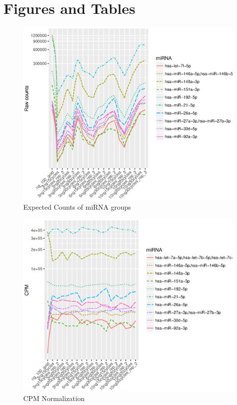 \documentclass{bioinfo}
\begin{document}
\section{Figures and Tables}
\onecolumn


\begin{figure}[!tpb]
\centerline{\includegraphics[scale=0.7]{fig-1-raw.eps}}
\caption{Expected Counts of miRNA groups}\label{fig:1}
\end{figure}

\begin{figure}[!tpb]
\centerline{\includegraphics[scale=0.7]{Fig-2-cpm.eps}}
\caption{CPM Normalization}\label{fig:2}
\end{figure} 
\end{document}
